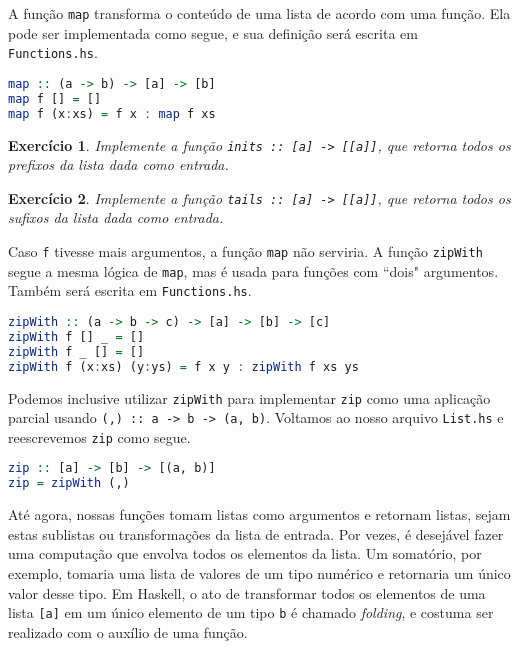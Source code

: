 \documentclass[a4paper]{article}
\newtheorem{exercicio}{Exercício}
\begin{document}
A função \texttt{map} transforma o conteúdo de uma lista de acordo com uma função.
Ela pode ser implementada como segue, e sua definição será escrita em \texttt{Functions.hs}.

\begin{lstlisting}[language=haskell, frame=single]
map :: (a -> b) -> [a] -> [b]
map f [] = []
map f (x:xs) = f x : map f xs
\end{lstlisting}

\begin{exercicio}
	Implemente a função \emph{\texttt{inits :: [a] -> [[a]]}}, que retorna todos os prefixos da lista dada como entrada.
\end{exercicio}

\begin{exercicio}
	Implemente a função \emph{\texttt{tails :: [a] -> [[a]]}}, que retorna todos os sufixos da lista dada como entrada.
\end{exercicio}

Caso \texttt{f} tivesse mais argumentos, a função \texttt{map} não serviria.
A função \texttt{zipWith} segue a mesma lógica de \texttt{map}, mas é usada para funções com ``dois" argumentos.
Também será escrita em \texttt{Functions.hs}.

\begin{lstlisting}[language=haskell, frame=single]
zipWith :: (a -> b -> c) -> [a] -> [b] -> [c]
zipWith f [] _ = []
zipWith f _ [] = []
zipWith f (x:xs) (y:ys) = f x y : zipWith f xs ys
\end{lstlisting}

Podemos inclusive utilizar \texttt{zipWith} para implementar \texttt{zip} como uma aplicação parcial usando \texttt{(,) :: a -> b -> (a, b)}.
Voltamos ao nosso arquivo \texttt{List.hs} e reescrevemos \texttt{zip} como segue.

\begin{lstlisting}[language=haskell, frame=single]
zip :: [a] -> [b] -> [(a, b)]
zip = zipWith (,)
\end{lstlisting}

Até agora, nossas funções tomam listas como argumentos e retornam listas, sejam estas sublistas ou transformações da lista de entrada.
Por vezes, é desejável fazer uma computação que envolva todos os elementos da lista.
Um somatório, por exemplo, tomaria uma lista de valores de um tipo numérico e retornaria um único valor desse tipo.
Em Haskell, o ato de transformar todos os elementos de uma lista \texttt{[a]} em um único elemento de um tipo \texttt{b} é chamado \emph{folding}, e costuma ser realizado com o auxílio de uma função.
\end{document}
